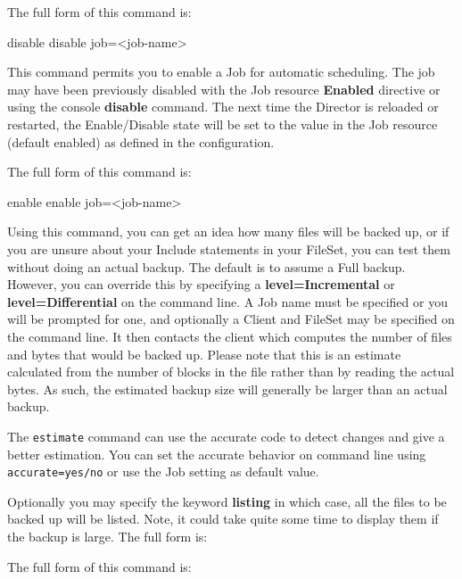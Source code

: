 \begin{description}
   The full form of this command is:
\begin{bconsole}{disable}
disable job=<job-name>
\end{bconsole}

\item [enable]
  This command permits you to enable a Job for automatic scheduling.
  The job may have been previously disabled with the Job resource
  {\bf Enabled} directive or using the console {\bf disable} command.
  The next time the Director is reloaded or restarted,
  the Enable/Disable state will be set to the value in the Job resource
  (default enabled) as defined in the \bareosDir configuration.

   The full form of this command is:

\begin{bconsole}{enable}
enable job=<job-name>
\end{bconsole}

\label{estimate}
\item [estimate]
   Using this command, you can get an idea how many files will be backed
   up, or if you are unsure about your Include statements in your FileSet,
   you can test them without doing an actual backup.  The default is to
   assume a Full backup.  However, you can override this by specifying a
   {\bf level=Incremental} or {\bf level=Differential} on the command line.
   A Job name must be specified or you will be prompted for one, and
   optionally a Client and FileSet may be specified on the command line.
   It then contacts the client which computes the number of files and bytes
   that would be backed up.  Please note that this is an estimate
   calculated from the number of blocks in the file rather than by reading
   the actual bytes.  As such, the estimated backup size will generally be
   larger than an actual backup.

   The \texttt{estimate} command can use the accurate code to detect changes
   and give a better estimation. You can set the accurate behavior on command
   line using \texttt{accurate=yes/no} or use the Job setting as default value.

   Optionally you may specify the keyword {\bf listing} in  which case, all the
   files to be backed up will be listed.  Note, it could take quite some time to
   display them if the  backup is large. The full form is:

   The full form of this command is:


\end{description}
